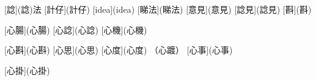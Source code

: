 [諗](諗)法
[計仔](計仔)
[idea](idea)
[睇法](睇法)
[意見](意見)
[諗見](諗見)
[斟](斟)

[心腸](心腸)
[心諗](心諗)
[心機](心機)

[心斟](心斟)
[心思](心思)
[心度](心度) （心踱）
[心事](心事)

[心掛](心掛)

